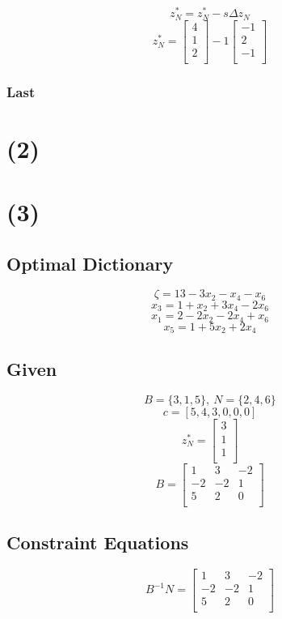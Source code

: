 \documentclass[14pt]{extarticle}
\begin{document}
\[
    z^*_N = z^*_N - s \Delta z_N
\]
\[
    z^*_N = \begin{bmatrix}
        4 \\
        1 \\
        2 \\
    \end{bmatrix}
    - 1 \begin{bmatrix}
        -1 \\
        2 \\
        -1 \\
    \end{bmatrix}
\]

\subsubsection*{Last}

\section*{(2)}

\section*{(3)}
\subsection*{Optimal Dictionary}
\[
    \zeta = 13-3x_2-x_4-x_6
\]
\[
    x_3 = 1+x_2+3x_4-2x_6
\]
\[
    x_1 = 2-2x_2-2x_4+x_6
\]
\[
    x_5 = 1+5x_2+2x_4
\]

\subsection*{Given}
\[
    B = \{3, 1, 5\},\ N = \{2, 4, 6\}
\]
\[
    c = [5, 4, 3, 0, 0, 0]
\]
\[
    z^*_N = \begin{bmatrix}
        3 \\
        1 \\
        1 \\
    \end{bmatrix}
\]
\[
    B = \begin{bmatrix}
        1 & 3 & -2 \\
        -2 & -2 & 1 \\
        5 & 2 & 0 \\
    \end{bmatrix}
\]

\subsection*{Constraint Equations}
\[
    B^{-1}N = \begin{bmatrix}
        1 & 3 & -2 \\
        -2 & -2 & 1 \\
        5 & 2 & 0 \\
    \end{bmatrix}
\]
\end{document}
